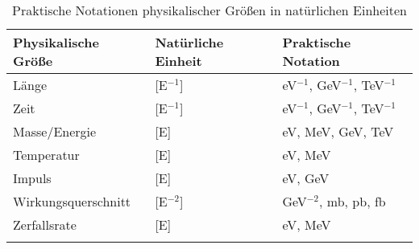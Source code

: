 \documentclass[12pt,a4paper]{article}
\begin{document}
	\begin{table}[ht]
		\centering
		\begin{adjustbox}{scale=1.2}
			\begin{tabular}{lll}
				\hline
				\textbf{Physikalische Größe} & \textbf{Natürliche Einheit} & \textbf{Praktische Notation} \\
				\hline
				Länge & [E$^{-1}$] & eV$^{-1}$, GeV$^{-1}$, TeV$^{-1}$ \\
				Zeit & [E$^{-1}$] & eV$^{-1}$, GeV$^{-1}$, TeV$^{-1}$ \\
				Masse/Energie & [E] & eV, MeV, GeV, TeV \\
				Temperatur & [E] & eV, MeV \\
				Impuls & [E] & eV, GeV \\
				Wirkungsquerschnitt & [E$^{-2}$] & GeV$^{-2}$, mb, pb, fb \\
				Zerfallsrate & [E] & eV, MeV \\
				\hline
				\multicolumn{2}{c}{} \\
				\hline
			\end{tabular}
		\end{adjustbox}
		\caption{Praktische Notationen physikalischer Größen in natürlichen Einheiten}
		\label{tab:practical_notation}
	\end{table}
	
\end{document}
